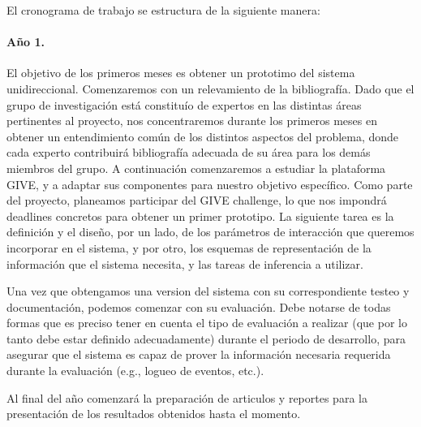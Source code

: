 
El cronograma de trabajo se estructura de la siguiente manera:

\paragraph{A\~no 1.} El objetivo de los primeros meses es obtener un
prototimo del sistema unidireccional.  Comenzaremos con un relevamiento
de la bibliograf\'ia.  Dado que el grupo de investigaci\'on est\'a
constitu\'io de expertos en las distintas \'areas pertinentes al
proyecto, nos concentraremos durante los primeros meses en obtener un
entendimiento com\'un de los distintos aspectos del problema, donde
cada experto contribuir\'a bibliograf\'ia adecuada de su \'area para los
dem\'as miembros del grupo.  A continuaci\'on comenzaremos a estudiar
la plataforma GIVE, y a adaptar sus componentes para nuestro objetivo
espec\'ifico.  Como parte del proyecto, planeamos participar del GIVE
challenge, lo que nos impondr\'a deadlines concretos para obtener un
primer prototipo.  La siguiente tarea es la definici\'on  y el dise\~no,
por un lado, de los par\'ametros de interacci\'on que queremos incorporar
en el sistema, y por otro, los esquemas de representaci\'on de la
informaci\'on que el sistema necesita, y las tareas de inferencia a
utilizar.


Una vez que obtengamos una version del sistema con su
correspondiente testeo y documentaci\'on, podemos comenzar con
su evaluaci\'on.  Debe notarse de todas formas que es preciso tener en cuenta
el tipo de evaluaci\'on a realizar (que por lo tanto debe estar definido
adecuadamente) durante el periodo de desarrollo, para asegurar que el sistema
es capaz de prover la informaci\'on necesaria requerida durante la evaluaci\'on
(e.g., logueo de eventos, etc.).

Al final del a\~no comenzar\'a la preparaci\'on de articulos y reportes para
la presentaci\'on de los resultados obtenidos hasta el momento.

